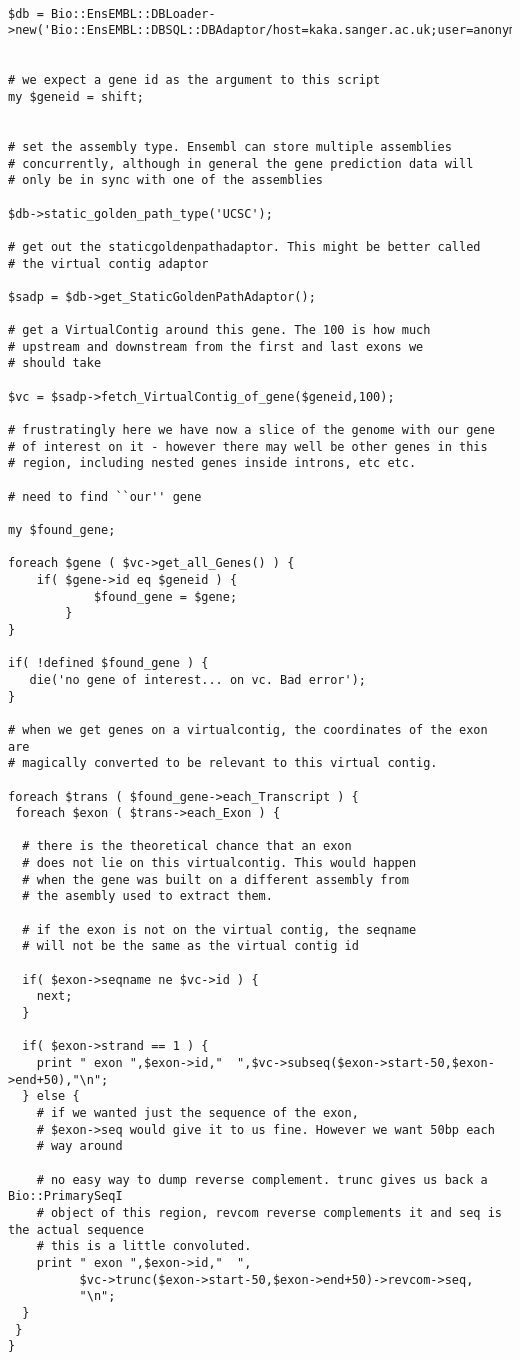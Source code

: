 \documentclass[11pt,a4paper]{article}
\begin{document}
\begin{verbatim}

$db = Bio::EnsEMBL::DBLoader->new('Bio::EnsEMBL::DBSQL::DBAdaptor/host=kaka.sanger.ac.uk;user=anonymous;dbname=current');


# we expect a gene id as the argument to this script
my $geneid = shift;


# set the assembly type. Ensembl can store multiple assemblies
# concurrently, although in general the gene prediction data will
# only be in sync with one of the assemblies

$db->static_golden_path_type('UCSC');

# get out the staticgoldenpathadaptor. This might be better called
# the virtual contig adaptor

$sadp = $db->get_StaticGoldenPathAdaptor();

# get a VirtualContig around this gene. The 100 is how much
# upstream and downstream from the first and last exons we
# should take

$vc = $sadp->fetch_VirtualContig_of_gene($geneid,100);

# frustratingly here we have now a slice of the genome with our gene
# of interest on it - however there may well be other genes in this
# region, including nested genes inside introns, etc etc.

# need to find ``our'' gene

my $found_gene;

foreach $gene ( $vc->get_all_Genes() ) {
	if( $gene->id eq $geneid ) {
            $found_gene = $gene;
        }
}

if( !defined $found_gene ) {
   die('no gene of interest... on vc. Bad error');
}

# when we get genes on a virtualcontig, the coordinates of the exon are
# magically converted to be relevant to this virtual contig.

foreach $trans ( $found_gene->each_Transcript ) {
 foreach $exon ( $trans->each_Exon ) {

  # there is the theoretical chance that an exon
  # does not lie on this virtualcontig. This would happen
  # when the gene was built on a different assembly from
  # the asembly used to extract them.

  # if the exon is not on the virtual contig, the seqname
  # will not be the same as the virtual contig id

  if( $exon->seqname ne $vc->id ) {
    next;
  }

  if( $exon->strand == 1 ) {
    print " exon ",$exon->id,"  ",$vc->subseq($exon->start-50,$exon->end+50),"\n";
  } else {
    # if we wanted just the sequence of the exon, 
    # $exon->seq would give it to us fine. However we want 50bp each
    # way around

    # no easy way to dump reverse complement. trunc gives us back a Bio::PrimarySeqI
    # object of this region, revcom reverse complements it and seq is the actual sequence
    # this is a little convoluted. 
    print " exon ",$exon->id,"  ",
          $vc->trunc($exon->start-50,$exon->end+50)->revcom->seq,
          "\n";
  }
 }
}

\end{verbatim}
\end{document}
